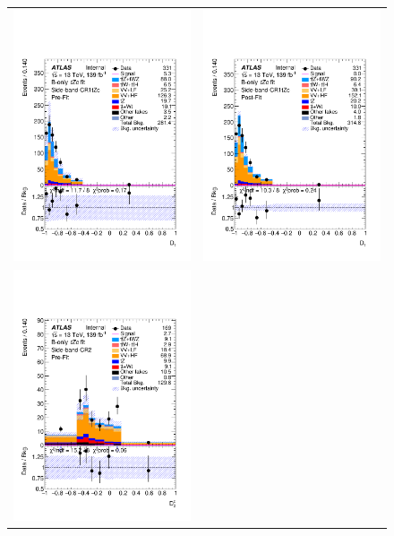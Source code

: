 \begin{figure}[htbp]
	\centering
	\begin{tabular}{cc}
		\includegraphics[width=.45\textwidth]{Appendices/AP10/figures/BONLY_CRSR_DL1rc_unblind/Plots/SBCR1} &
		\includegraphics[width=.45\textwidth]{Appendices/AP10/figures/BONLY_CRSR_DL1rc_unblind/Plots/SBCR1_postFit} \\
		\includegraphics[width=.45\textwidth]{Appendices/AP10/figures/BONLY_CRSR_DL1rc_unblind/Plots/SBCR2} &

\end{tabular}
\end{figure}
